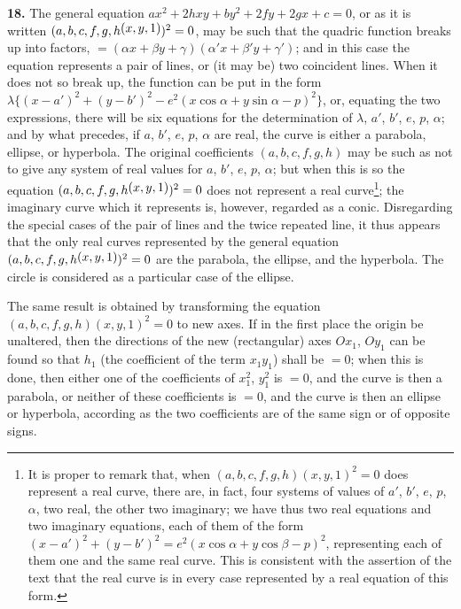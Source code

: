\documentclass[11pt,a4paper]{book}
\begin{document}
\textbf{18.} The general equation $ax^2+2hxy+by^2+2fy+2gx+c=0$, or as it is written $(a,b,c,f,g,h\,\raisebox{0.5ex}{\text{$\!(x,y,1)$}})^2=0$, may be such that the quadric function breaks up into factors, $=(\alpha x+\beta y+\gamma)(\alpha' x+\beta' y+\gamma')$; and in this case the equation represents a pair of lines, or (it may be) two coincident lines. When it does not so break up, the function can be put in the form $\lambda\{(x-a')^2+(y-b')^2-e^2(x\cos\alpha+y\sin\alpha-p)^2\}$, or, equating the two expressions, there will be six equations for the determination of $\lambda$, $a'$, $b'$, $e$, $p$, $\alpha$; and by what precedes, if $a$, $b'$, $e$, $p$, $\alpha$ are real, the curve is either a parabola, ellipse, or hyperbola. The original coefficients $(a,b,c,f,g,h)$ may be such as not to give any system of real values for $a$, $b'$, $e$, $p$, $\alpha$; but when this is so the equation $(a,b,c,f,g,h\,\raisebox{0.5ex}{\text{$\!(x,y,1)$}})^2=0$ does not represent a real curve\footnote{It is proper to remark that, when $(a,b,c,f,g,h)(x,y,1)^2=0$ does represent a real curve, there are, in fact, four systems of values of $a'$, $b'$, $e$, $p$, $\alpha$, two real, the other two imaginary; we have thus two real equations and two imaginary equations, each of them of the form $(x-a')^2+(y-b')^2=e^2(x\cos\alpha+y\cos\beta-p)^2$, representing each of them one and the same real curve. This is consistent with the assertion of the text that the real curve is in every case represented by a real equation of this form.}; the imaginary curve which it represents is, however, regarded as a conic. Disregarding the special cases of the pair of lines and the twice repeated line, it thus appears that the only real curves represented by the general equation $(a,b,c,f,g,h\,\raisebox{0.5ex}{\text{$\!(x,y,1)$}})^2=0$ are the parabola, the ellipse, and the hyperbola. The circle is considered as a particular case of the ellipse.

The same result is obtained by transforming the equation $(a,b,c,f,g,h)(x,y,1)^2=0$ to new axes. If in the first place the origin be unaltered, then the directions of the new (rectangular) axes $Ox_1$, $Oy_1$ can be found so that $h_1$ (the coefficient of the term $x_1y_1$) shall be $=0$; when this is done, then either one of the coefficients of $x_1^2$, $y_1^2$ is $=0$, and the curve is then a parabola, or neither of these coefficients is $=0$, and the curve is then an ellipse or hyperbola, according as the two coefficients are of the same sign or of opposite signs.
\end{document}
